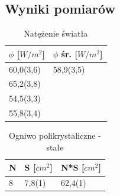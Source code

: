 \documentclass[12pt,a4paper]{article}
\begin{document}
\subsection{Wyniki pomiarów}

\begin{table}[H]
\centering
\caption{Natężenie światła}
\label{my-label}
\begin{tabular}{|p{3cm}|p{3cm}|}
\hline
$\phi$ {[}$W/m^2${]}	& $\phi$ śr. {[}$W/m^2${]}\\
\hline
60,0(3,6)				& 58,9(3,5)	\\
65,2(3,8)				&			\\
54,5(3,3)				&			\\
55,8(3,4)				&			\\
\hline   
\end{tabular}
\end{table}

\begin{table}[H]
\centering
\caption{Ogniwo polikrystaliczne - stałe}
\label{polistale}
\begin{tabular}{|p{2cm}|p{2cm}|p{2cm}|}
\hline
N & S {[}$cm^2${]} & N*S {[}$cm^2${]}   \\
\hline
8 & 7,8(1) & 62,4(1) \\
\hline
\end{tabular}
\end{table}
\end{document}
